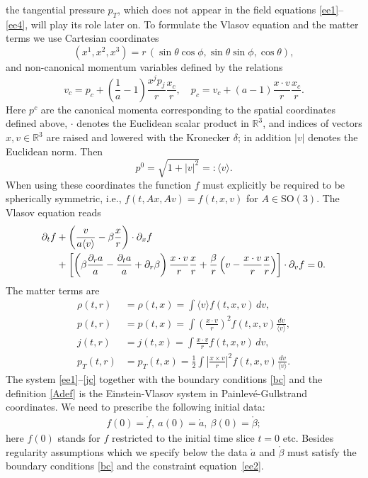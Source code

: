 \documentclass[11pt]{article}
\def\R{\mathbb R}
\def\p0{\langle v \rangle}
\begin{document}
the tangential pressure $p_T$, which does not appear in the field equations
\eqref{ee1}--\eqref{ee4}, will play its role later on.
To formulate the Vlasov equation and the matter terms we
use Cartesian coordinates
\[
(x^1,x^2,x^3) = r\,(\sin\theta\cos\phi,\sin\theta\sin\phi,\cos\theta),
\]
and non-canonical momentum variables defined by the relations
\[
v_c = p_c + \left(\frac{1}{a} -1\right) \frac{x^j p_j}{r} \frac{x_c}{r},\quad
p_c = v_c + (a-1) \frac{x\cdot v}{r} \frac{x_c}{r}.
\]
Here $p^c$ are the canonical momenta corresponding to the spatial coordinates
defined above,
$\cdot$ denotes the Euclidean scalar product in $\R^3$,
and indices of vectors
$x, v \in \R^3$ are raised and lowered with the Kronecker $\delta$;
in addition $|v|$ denotes the Euclidean norm.
Then
\[
p^0 = \sqrt{1+|v|^2} =: \p0.
\]
When using these coordinates the function $f$ must explicitly
be required to be spherically symmetric,
i.e., $f(t,A x,A v)= f(t,x,v)$ for $A\in \mathrm{SO}(3)$.
The Vlasov equation reads
\begin{align}\label{Vl-cart}
  \partial_t f
  &+
  \left(\frac{v}{a \p0}-\beta\frac{x}{r}\right)\cdot \partial_x f\notag \\
  & {}+ \left[\left(\beta\frac{\partial_r a}{a} -\frac{\partial_t a}{a}
    +\partial_r\beta\right)\frac{x\cdot v}{r} \frac{x}{r}
    +\frac{\beta}{r}\left(v - \frac{x\cdot v}{r} \frac{x}{r}\right)\right]
  \cdot\partial_v f=0.
\end{align}
The matter terms are
\begin{align}
\rho(t,r) 
&=
\rho(t,x) = \int \p0 f(t,x,v)\,dv ,\label{rhoc}\\
p(t,r) 
&=
p(t,x) = \int \left(\frac{x\cdot v}{r}\right)^2
 f(t,x,v)\frac{dv}{\p0}, \label{pc}\\
j(t,r) 
&=
j(t,x) = \int \frac{x\cdot v}{r} f(t,x,v)\, dv, \label{jc}\\
p_T(t,r) 
&=
p_T(t,x) = \frac{1}{2} \int \left|{\frac{x\times v}{r}}\right|^2
f(t,x,v) \frac{dv}{\p0}. \label{p_Tc}
\end{align}
The system \eqref{ee1}--\eqref{jc} together with the boundary conditions
\eqref{bc} and the definition \eqref{Adef} is the Einstein-Vlasov system
in Painlev\'{e}-Gullstrand coordinates.
We need to prescribe the following initial data:
\begin{align}\label{indata}
f(0) =\mathring{f},\ a(0)=\mathring{a},\
\beta(0)=\mathring{\beta};
\end{align}
here $f(0)$ stands for $f$
restricted to the initial time slice $t=0$ etc.
Besides regularity assumptions which we specify below
the data $\mathring{a}$ and $\mathring{\beta}$ must
satisfy the boundary conditions
\eqref{bc} and the constraint equation~\eqref{ee2}.
\end{document}
